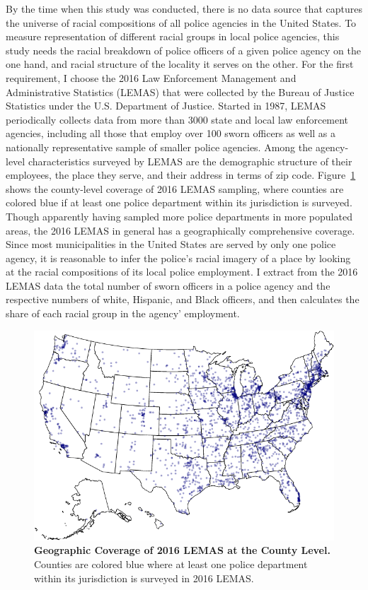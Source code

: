 \documentclass[
  12pt,
]{article}
\begin{document}
By the time when this study was conducted, there is no data source that
captures the universe of racial compositions of all police agencies in
the United States. To measure representation of different racial groups
in local police agencies, this study needs the racial breakdown of
police officers of a given police agency on the one hand, and racial
structure of the locality it serves on the other. For the first
requirement, I choose the 2016 Law Enforcement Management and
Administrative Statistics (LEMAS) that were collected by the Bureau of
Justice Statistics under the U.S. Department of Justice. Started in
1987, LEMAS periodically collects data from more than 3000 state and
local law enforcement agencies, including all those that employ over 100
sworn officers as well as a nationally representative sample of smaller
police agencies. Among the agency-level characteristics surveyed by
LEMAS are the demographic structure of their employees, the place they
serve, and their address in terms of zip code.
Figure~\ref{fig-lemas-cover} shows the county-level coverage of 2016
LEMAS sampling, where counties are colored blue if at least one police
department within its jurisdiction is surveyed. Though apparently having
sampled more police departments in more populated areas, the 2016 LEMAS
in general has a geographically comprehensive coverage. Since most
municipalities in the United States are served by only one police
agency, it is reasonable to infer the police's racial imagery of a place
by looking at the racial compositions of its local police employment. I
extract from the 2016 LEMAS data the total number of sworn officers in a
police agency and the respective numbers of white, Hispanic, and Black
officers, and then calculates the share of each racial group in the
agency' employment.

\begin{figure}[tb]

{\centering \includegraphics{racialized-police_files/figure-pdf/fig-lemas-cover-1.pdf}

}

\caption{\label{fig-lemas-cover}\textbf{Geographic Coverage of 2016
LEMAS at the County Level.} Counties are colored blue where at least one
police department within its jurisdiction is surveyed in 2016 LEMAS.}

\end{figure}
\end{document}
